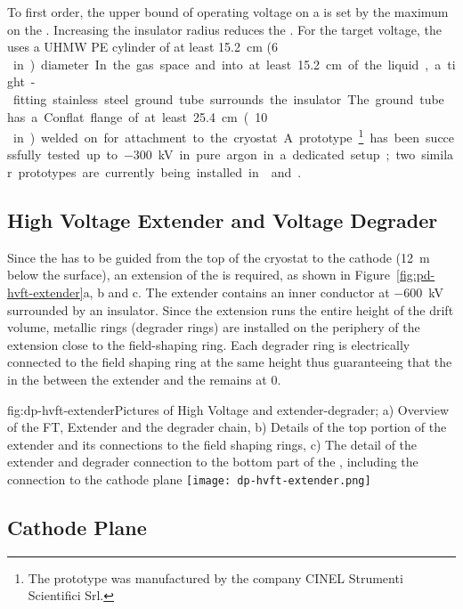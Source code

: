 To first order, the upper bound of operating voltage on a \fdth is set by the maximum \efield on the \fdth.  Increasing the insulator radius reduces the \efield.  For the target voltage, the \fdth uses a UHMW PE cylinder of at least \SI{15.2}{\cm} (\SI{6}\,in) diameter.  In the gas space and into at least \SI{15.2}{\cm} of the liquid, a tight-fitting stainless steel ground tube surrounds the insulator.  The ground tube has a Conflat flange of at least \SI{25.4}{\cm} (\SI{10}\,in) welded on for attachment to the cryostat.  A prototype\footnote{The prototype was manufactured by the company CINEL\texttrademark{} Strumenti Scientifici Srl.}  has been successfully tested up to \SI{-300}{\kV} in pure argon in a dedicated setup; two similar prototypes are currently being installed in  and .


\subsection{High Voltage Extender and Voltage Degrader}

Since the \hv has to be guided from the top of the cryostat to the cathode (\SI{12}{\m} below the  surface), an extension of the \hv \fdth is required, as shown in Figure~\ref{fig:pd-hvft-extender}a, b and c. The extender contains an inner conductor at \SI{-600}{\kV} surrounded by an insulator. Since the extension runs the entire height of the drift volume, metallic rings (degrader rings) are installed on the periphery of the extension close to the field-shaping ring. Each degrader ring is electrically connected to the field shaping ring at the same height thus guaranteeing that the \efield in the \lar between the extender and the  remains at 0.


\begin{dunefigure}{fig:dp-hvft-extender}{Pictures of High Voltage \fdth and  extender-degrader; a) Overview of the  FT,  Extender and the degrader chain, b) Details of the top portion of the  extender and its connections to the field shaping rings, c) The detail of the  extender and degrader connection to the bottom part of the , including the connection to the cathode plane}
\texttt{[image: dp-hvft-extender.png]}
\end{dunefigure}

\subsection{Cathode Plane}

